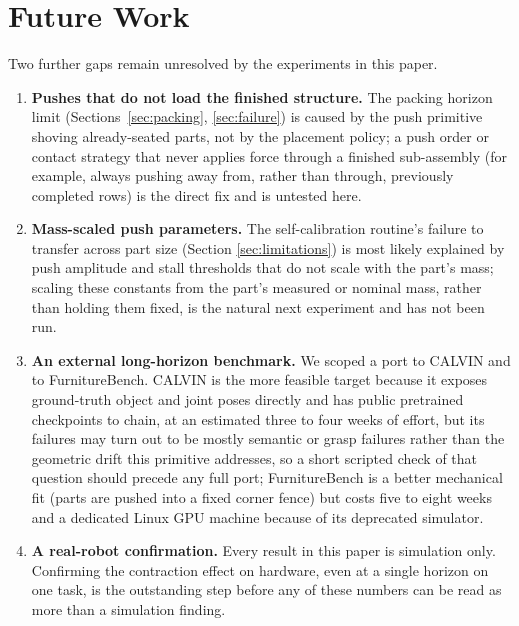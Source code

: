 \documentclass[11pt]{article}
\begin{document}
\section{Future Work}
\label{sec:todo}

Two further gaps remain unresolved by the experiments in this paper.

\begin{enumerate}[leftmargin=*]
  \item \textbf{Pushes that do not load the finished structure.} The
  packing horizon limit (Sections~\ref{sec:packing}, \ref{sec:failure}) is
  caused by the push primitive shoving already-seated parts, not by the
  placement policy; a push order or contact strategy that never applies
  force through a finished sub-assembly (for example, always pushing away
  from, rather than through, previously completed rows) is the direct fix
  and is untested here.
  \item \textbf{Mass-scaled push parameters.} The self-calibration
  routine's failure to transfer across part size (Section
  \ref{sec:limitations}) is most likely explained by push amplitude and
  stall thresholds that do not scale with the part's mass; scaling these
  constants from the part's measured or nominal mass, rather than holding
  them fixed, is the natural next experiment and has not been run.
  \item \textbf{An external long-horizon benchmark.} We scoped a port to
  CALVIN and to FurnitureBench. CALVIN is the more feasible target because
  it exposes ground-truth object and joint poses directly and has public
  pretrained checkpoints to chain, at an estimated three to four weeks of
  effort, but its failures may turn out to be mostly semantic or grasp
  failures rather than the geometric drift this primitive addresses, so a
  short scripted check of that question should precede any full port;
  FurnitureBench is a better mechanical fit (parts are pushed into a fixed
  corner fence) but costs five to eight weeks and a dedicated Linux GPU
  machine because of its deprecated simulator.
  \item \textbf{A real-robot confirmation.} Every result in this paper is
  simulation only. Confirming the contraction effect on hardware, even at
  a single horizon on one task, is the outstanding step before any of
  these numbers can be read as more than a simulation finding.
\end{enumerate}
\end{document}
